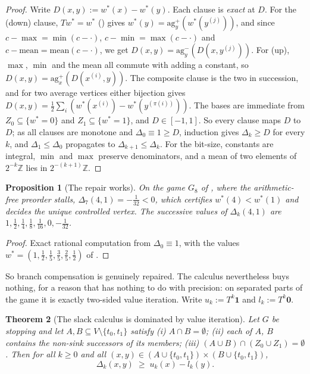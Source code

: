 \documentclass[11pt]{article}
\theoremstyle{plain}
\newtheorem{theorem}{Theorem}[section]
\newtheorem{proposition}[theorem]{Proposition}
\theoremstyle{definition}
\begin{document}
\begin{proof}
Write $D(x,y):=w^\ast(x)-w^\ast(y)$. Each clause is \emph{exact} at $D$.
For the (down) clause, $Tw^\ast=w^\ast$ () gives
$w^\ast(y)=\mathrm{ag}^{+}_{y}(w^\ast(y^{(j)}))$, and since
$c-\max=\min(c-\cdot)$, $c-\min=\max(c-\cdot)$ and $c-\mathrm{mean}
=\mathrm{mean}(c-\cdot)$, we get
$D(x,y)=\mathrm{ag}^{-}_{y}(D(x,y^{(j)}))$. For (up), $\max$, $\min$ and
the mean all commute with adding a constant, so
$D(x,y)=\mathrm{ag}^{+}_{x}(D(x^{(i)},y))$. The composite clause is the
two in succession, and for two average vertices either bijection gives
$D(x,y)=\tfrac12\sum_i(w^\ast(x^{(i)})-w^\ast(y^{(\pi(i))}))$. The bases
are immediate from $Z_0\subseteq\{w^\ast=0\}$ and
$Z_1\subseteq\{w^\ast=1\}$, and $D\in[-1,1]$. So every clause maps $D$ to
$D$; as all clauses are monotone and $\Delta_0\equiv1\ge D$, induction
gives $\Delta_k\ge D$ for every $k$, and $\Delta_1\le\Delta_0$ propagates
to $\Delta_{k+1}\le\Delta_k$. For the bit-size, constants are integral,
$\min$ and $\max$ preserve denominators, and a mean of two elements of
$2^{-k}\mathbb{Z}$ lies in $2^{-(k+1)}\mathbb{Z}$.
\end{proof}

\begin{proposition}[The repair works]\label{prop:slack-repairs}
On the game $G_8$ of , where the
arithmetic-free preorder stalls, $\Delta_7(4,1)=-\tfrac1{32}<0$, which
certifies $w^\ast(4)<w^\ast(1)$ and decides the unique controlled vertex.
The successive values of $\Delta_k(4,1)$ are
$1,\tfrac12,\tfrac14,\tfrac18,\tfrac1{16},0,-\tfrac1{32}$.
\end{proposition}

\begin{proof}
Exact rational computation from $\Delta_0\equiv1$, with the values
$w^\ast=(1,\tfrac12,\tfrac15,\tfrac35,\tfrac25,\tfrac12)$ of
.
\end{proof}

So branch compensation is genuinely repaired. The calculus nevertheless
buys nothing, for a reason that has nothing to do with precision: on
separated parts of the game it is exactly two-sided value iteration.
Write $u_k:=T^{k}\mathbf 1$ and $l_k:=T^{k}\mathbf 0$.

\begin{theorem}[The slack calculus is dominated by value iteration]\label{thm:slack-barrier}
Let $G$ be stopping and let $A,B\subseteq V\setminus\{t_0,t_1\}$ satisfy
(i) $A\cap B=\emptyset$; (ii) each of $A$, $B$ contains the non-sink
successors of its members; (iii) $(A\cup B)\cap(Z_0\cup Z_1)=\emptyset$.
Then for all $k\ge0$ and all
$(x,y)\in(A\cup\{t_0,t_1\})\times(B\cup\{t_0,t_1\})$,
\[
  \Delta_k(x,y)\;\ge\;u_k(x)-l_k(y).
\]
\end{theorem}
\end{document}
